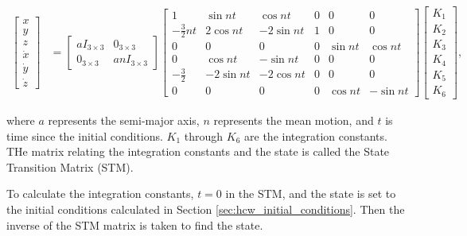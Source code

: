 \begin{align} \label{eq:HCW_solution}
\begin{bmatrix}
x \\ y \\ z \\ \dot{x} \\ \dot{y} \\ \dot{z}
\end{bmatrix}
&=
\begin{bmatrix}
a I_{3 \times 3} & 0_{3 \times 3} \\
0_{3 \times 3} & a n I_{3 \times 3}
\end{bmatrix}
\begin{bmatrix}
1 & \sin nt & \cos nt & 0 & 0 & 0 \\
-\frac{3}{2}nt & 2 \cos nt & -2 \sin nt & 1 & 0 & 0 \\
0 & 0 & 0 & 0 & \sin nt & \cos nt \\
0 & \cos nt & -\sin nt & 0 & 0 & 0 \\
-\frac{3}{2} & -2 \sin nt & -2 \cos nt & 0 & 0 & 0 \\
0 & 0 & 0 & 0 & \cos nt & -\sin nt
\end{bmatrix}
\begin{bmatrix}
K_1 \\ K_2 \\ K_3 \\ K_4 \\ K_5 \\ K_6
\end{bmatrix},
\end{align}

where $a$ represents the semi-major axis, $n$ represents the mean motion, and $t$ is time since the initial conditions. $K_1$ through $K_6$ are the integration constants. THe matrix relating the integration constants and the state is called the State Transition Matrix (STM).

To calculate the integration constants, $t = 0$ in the STM, and the state is set to the initial conditions calculated in Section \ref{sec:hcw_initial_conditions}. Then the inverse of the STM matrix is taken to find the state.

